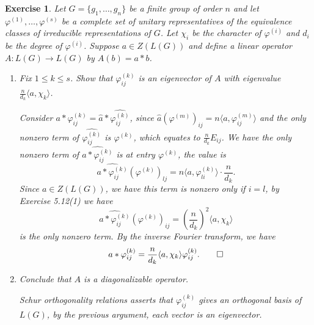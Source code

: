 \documentclass[11pt]{report}
\theoremstyle{mythm}
\let\oldendproof\endproof
\renewenvironment{proof}[1][\proofname]{%
  \oldproof[\normalfont \bfseries #1]%
}{\oldendproof}
\newtheorem{exercise}{Exercise}[chapter]
\renewcommand*{\proofname}{Proof}
\theoremstyle{myans}
\newcommand{\ang}[1]{\langle #1 \rangle}
\begin{document}
\begin{exercise}
  Let $G=\{g_1,\dots,g_n\}$ be a finite group of order $n$ and let $\varphi^{(1)},\dots,\varphi^{(s)}$ be
  a complete set of unitary representatives of the equivalence classes of
  irreducible representations of $G$. Let $\chi_i$ be the character of $\varphi^{(i)}$ and $d_i$ be the
  degree of $\varphi^{(i)}$. Suppose $a \in Z(L(G))$ and define a linear operator $A\colon L(G) \to L(G)$
  by $A(b) = a*b$.
  \begin{enumerate}
    \item Fix $1 \leq k \leq s$. Show that $\varphi^{(k)}_{ij}$ is an eigenvector of $A$
    with eigenvalue $\frac{n}{d_k} \ang{a, \chi_k}$.
    \begin{proof}
      Consider $\widehat{a * \varphi^{(k)}_{ij}} = \hat a * \widehat{\varphi^{(k)}_{ij}}$,
      since $\hat a(\varphi^{(m)})_{ij} = n\ang{a, \varphi^{(m)}_{ij}}$
      and the only nonzero term of $\widehat{\varphi_{ij}^{(k)}}$ is $\varphi^{(k)}$,
      which equates to $\frac{n}{d_k} E_{ij}$. We have the only nonzero term
      of $\widehat{a * \varphi_{ij}^{(k)}}$ is at entry $\varphi^{(k)}$,
      the value is
      \[ \widehat{a * \varphi_{ij}^{(k)}}(\varphi^{(k)})_{lj}
      = n\ang{a, \varphi_{li}^{(k)}} \cdot \frac{n}{d_k}. \]
      Since $a\in Z(L(G))$, we have this term is nonzero only if $i=l$, by Exercise 5.12(1) we have
      \[ \widehat{a * \varphi_{ij}^{(k)}}(\varphi^{(k)})_{ij}
      = \left(\frac{n}{d_k}\right)^2\ang{a, \chi_k} \]
      is the only nonzero term. By the inverse Fourier transform, we have
      \[ a * \varphi_{ij}^{(k)} = \frac{n}{d_k}\ang{a, \chi_k} \varphi_{ij}^{(k)}. \qedhere \]
    \end{proof}
    \item Conclude that $A$ is a diagonalizable operator.
    \begin{proof}
      Schur orthogonality relations asserts that $\varphi_{ij}^{(k)}$ gives an orthogonal basis
      of $L(G)$, by the previous argument, each vector is an eigenvector.
    \end{proof}
  \end{enumerate}
\end{exercise}
\end{document}
